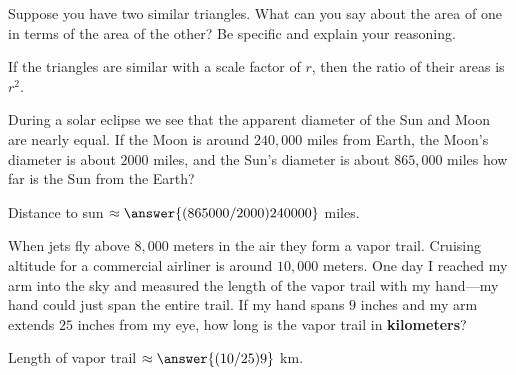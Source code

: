 \documentclass[nooutcomes]{ximera}
\begin{document}
\begin{question}
Suppose you have two similar triangles. What can you say about
  the area of one in terms of the area of the other? Be specific and
  explain your reasoning.
\begin{freeResponse}
\begin{hint}
If the triangles are similar with a scale factor of $r$, then the ratio of their areas is $r^2$. 
\end{hint}
\end{freeResponse}
\end{question}

\begin{question}
During a solar eclipse we see that the apparent diameter of the
  Sun and Moon are nearly equal. If the Moon is around $240,000$ miles
  from Earth, the Moon's diameter is about $2000$ miles, and the Sun's
  diameter is about $865,000$ miles how far is the Sun from the Earth?

Distance to sun $\approx \answer{(865000/2000)240000}$ miles. 
\end{question}

\begin{question}
When jets fly above $8,000$ meters in the air they form a vapor
  trail. Cruising altitude for a commercial airliner is around $10,000$
  meters. One day I reached my arm into the sky and measured the
  length of the vapor trail with my hand---my hand could just span the
  entire trail. If my hand spans $9$ inches and my arm extends $25$
  inches from my eye, how long is the vapor trail in \textbf{kilometers}? 

Length of vapor trail $\approx \answer{(10/25)9}$ km. 
\end{question}
\end{document}
